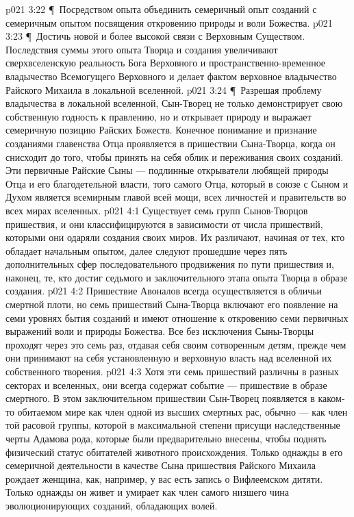 \vs p021 3:22 \P\ \bibnobreakspace Посредством опыта объединить семеричный опыт созданий с семеричным опытом посвящения откровению природы и воли Божества.
\vs p021 3:23 \P\ \bibnobreakspace Достичь новой и более высокой связи с Верховным Существом. Последствия суммы этого опыта Творца и создания увеличивают сверхвселенскую реальность Бога Верховного и пространственно\hyp{}временное владычество Всемогущего Верховного и делает фактом верховное владычество Райского Михаила в локальной вселенной.
\vs p021 3:24 \P\ Разрешая проблему владычества в локальной вселенной, Сын\hyp{}Творец не только демонстрирует свою собственную годность к правлению, но и открывает природу и выражает семеричную позицию Райских Божеств. Конечное понимание и признание созданиями главенства Отца проявляется в пришествии Сына\hyp{}Творца, когда он снисходит до того, чтобы принять на себя облик и переживания своих созданий. Эти первичные Райские Сыны --- подлинные открыватели любящей природы Отца и его благодетельной власти, того самого Отца, который в союзе с Сыном и Духом является всемирным главой всей мощи, всех личностей и правительств во всех мирах вселенных.
\vs p021 4:1 Существует семь групп Сынов\hyp{}Творцов пришествия, и они классифицируются в зависимости от числа пришествий, которыми они одаряли создания своих миров. Их различают, начиная от тех, кто обладает начальным опытом, далее следуют прошедшие через пять дополнительных сфер последовательного продвижения по пути пришествия и, наконец, те, кто достиг седьмого и заключительного этапа опыта Творца в образе создания.
\vs p021 4:2 Пришествие Авоналов всегда осуществляется в обличьи смертной плоти, но семь пришествий Сына\hyp{}Творца включают его появление на семи уровнях бытия созданий и имеют отношение к откровению семи первичных выражений воли и природы Божества. Все без исключения Сыны\hyp{}Творцы проходят через это семь раз, отдавая себя своим сотворенным детям, прежде чем они принимают на себя установленную и верховную власть над вселенной их собственного творения.
\vs p021 4:3 Хотя эти семь пришествий различны в разных секторах и вселенных, они всегда содержат событие --- пришествие в образе смертного. В этом заключительном пришествии Сын\hyp{}Творец появляется в каком\hyp{}то обитаемом мире как член одной из высших смертных рас, обычно --- как член той расовой группы, которой в максимальной степени присущи наследственные черты Адамова рода, которые были предварительно внесены, чтобы поднять физический статус обитателей животного происхождения. Только однажды в его семеричной деятельности в качестве Сына пришествия Райского Михаила рождает женщина, как, например, у вас есть запись о Вифлеемском дитяти. Только однажды он живет и умирает как член самого низшего чина эволюционирующих созданий, обладающих волей.
